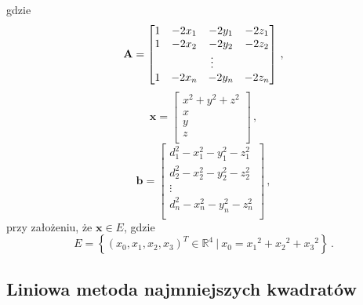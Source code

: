 gdzie
\begin{equation}
    \mathbf{A} =
    \left[
        \begin{matrix}
            1 & -2x_1 & -2y_1 & -2z_1  \\
            1 & -2x_2 & -2y_2 & -2z_2  \\
            \multicolumn{4}{c}{\vdots} \\
            1 & -2x_n & -2y_n & -2z_n  \\
        \end{matrix}
        \right]\,,
\end{equation}
\begin{equation}
    \mathbf{x} =
    \left[
        \begin{matrix}
            x^2 + y^2 + z^2 \\
            x               \\
            y               \\
            z               \\
        \end{matrix}
        \right]\,,
\end{equation}
\begin{equation}
    \mathbf{b} =
    \left[
        \begin{matrix}
            d_1^2 - x_1^2 - y_1^2 - z_1^2 \\
            d_2^2 - x_2^2 - y_2^2 - z_2^2 \\
            \vdots                        \\
            d_n^2 - x_n^2 - y_n^2 - z_n^2 \\
        \end{matrix}
    \right]\,,
\end{equation}
\noindent
przy założeniu, że $\mathbf{x} \in E$, gdzie
\begin{equation}
    E = \left\{(x_0, x_1, x_2, x_3)^T \in {\mathbb{R}}^4\ |\ x_0 = {x_1}^2 + {x_2}^2 + {x_3}^2\right\}\,.
    \label{eq:constraint}
\end{equation}

\subsection{Liniowa metoda najmniejszych kwadratów}

